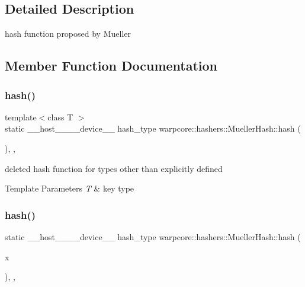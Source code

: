 \subsection{Detailed Description}
hash function proposed by Mueller 

\subsection{Member Function Documentation}
\mbox{\label{classwarpcore_1_1hashers_1_1MuellerHash_af2d2d88d32709788964af04198e4f60c}} 
\subsubsection{\texorpdfstring{hash()}{hash()}\hspace{0.1cm}{\footnotesize\ttfamily [1/2]}}
{\footnotesize\ttfamily template$<$class T $>$ \\
static \+\_\+\+\_\+host\+\_\+\+\_\+\+\_\+\+\_\+device\+\_\+\+\_\+ hash\+\_\+type warpcore\+::hashers\+::\+Mueller\+Hash\+::hash (\begin{DoxyParamCaption}\item[{T}]{ }\end{DoxyParamCaption})\hspace{0.3cm}{\ttfamily [inline]}, {\ttfamily [static]}, {\ttfamily [delete]}}



deleted hash function for types other than explicitly defined 


\begin{DoxyTemplParams}{Template Parameters}
{\em T} & key type \\
\hline
\end{DoxyTemplParams}
\mbox{\label{classwarpcore_1_1hashers_1_1MuellerHash_aa02ad6cfc87f45c9c16fb563811f8919}} 
\subsubsection{\texorpdfstring{hash()}{hash()}\hspace{0.1cm}{\footnotesize\ttfamily [2/2]}}
{\footnotesize\ttfamily static \+\_\+\+\_\+host\+\_\+\+\_\+\+\_\+\+\_\+device\+\_\+\+\_\+ hash\+\_\+type warpcore\+::hashers\+::\+Mueller\+Hash\+::hash (\begin{DoxyParamCaption}\item[{key\+\_\+type}]{x }\end{DoxyParamCaption})\hspace{0.3cm}{\ttfamily [inline]}, {\ttfamily [static]}, {\ttfamily [noexcept]}}



